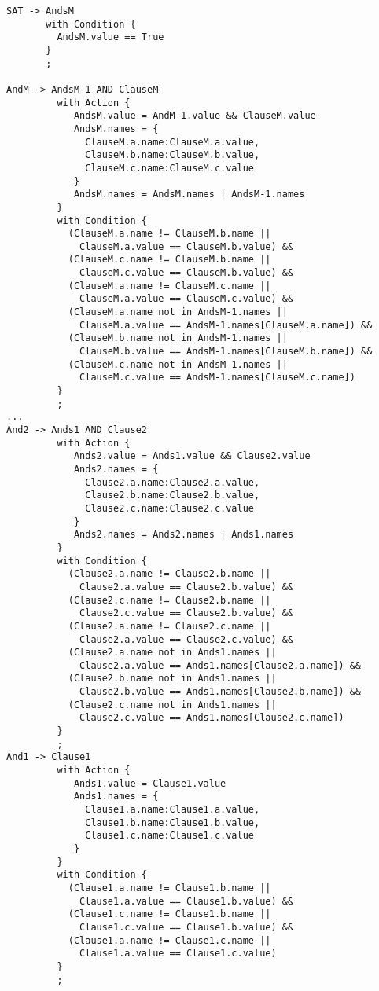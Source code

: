 \begin{verbatim}
SAT -> AndsM
       with Condition {
         AndsM.value == True
       }
       ;

AndM -> AndsM-1 AND ClauseM
         with Action {
            AndsM.value = AndM-1.value && ClauseM.value
            AndsM.names = {
              ClauseM.a.name:ClauseM.a.value,
              ClauseM.b.name:ClauseM.b.value,
              ClauseM.c.name:ClauseM.c.value
            }
            AndsM.names = AndsM.names | AndsM-1.names
         }
         with Condition {
           (ClauseM.a.name != ClauseM.b.name ||
             ClauseM.a.value == ClauseM.b.value) &&
           (ClauseM.c.name != ClauseM.b.name ||
             ClauseM.c.value == ClauseM.b.value) &&
           (ClauseM.a.name != ClauseM.c.name ||
             ClauseM.a.value == ClauseM.c.value) &&
           (ClauseM.a.name not in AndsM-1.names ||
             ClauseM.a.value == AndsM-1.names[ClauseM.a.name]) &&
           (ClauseM.b.name not in AndsM-1.names ||
             ClauseM.b.value == AndsM-1.names[ClauseM.b.name]) &&
           (ClauseM.c.name not in AndsM-1.names ||
             ClauseM.c.value == AndsM-1.names[ClauseM.c.name])
         }
         ;
...
And2 -> Ands1 AND Clause2
         with Action {
            Ands2.value = Ands1.value && Clause2.value
            Ands2.names = {
              Clause2.a.name:Clause2.a.value,
              Clause2.b.name:Clause2.b.value,
              Clause2.c.name:Clause2.c.value
            }
            Ands2.names = Ands2.names | Ands1.names
         }
         with Condition {
           (Clause2.a.name != Clause2.b.name ||
             Clause2.a.value == Clause2.b.value) &&
           (Clause2.c.name != Clause2.b.name ||
             Clause2.c.value == Clause2.b.value) &&
           (Clause2.a.name != Clause2.c.name ||
             Clause2.a.value == Clause2.c.value) &&
           (Clause2.a.name not in Ands1.names ||
             Clause2.a.value == Ands1.names[Clause2.a.name]) &&
           (Clause2.b.name not in Ands1.names ||
             Clause2.b.value == Ands1.names[Clause2.b.name]) &&
           (Clause2.c.name not in Ands1.names ||
             Clause2.c.value == Ands1.names[Clause2.c.name])
         }
         ;
And1 -> Clause1
         with Action {
            Ands1.value = Clause1.value
            Ands1.names = {
              Clause1.a.name:Clause1.a.value,
              Clause1.b.name:Clause1.b.value,
              Clause1.c.name:Clause1.c.value
            }
         }
         with Condition {
           (Clause1.a.name != Clause1.b.name ||
             Clause1.a.value == Clause1.b.value) &&
           (Clause1.c.name != Clause1.b.name ||
             Clause1.c.value == Clause1.b.value) &&
           (Clause1.a.name != Clause1.c.name ||
             Clause1.a.value == Clause1.c.value)
         }
         ;


\end{verbatim}
